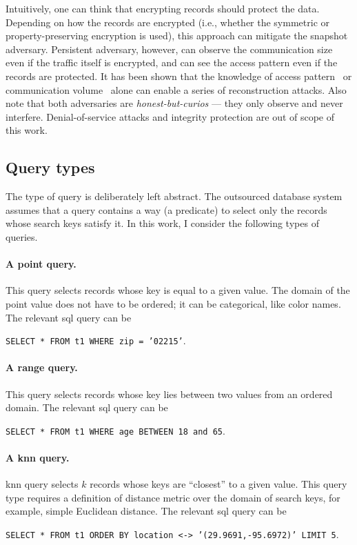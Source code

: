			Intuitively, one can think that encrypting records should protect the data.
			Depending on how the records are encrypted (i.e., whether the symmetric or property-preserving encryption is used), this approach can mitigate the snapshot adversary.
			Persistent adversary, however, can observe the communication size even if the traffic itself is encrypted, and can see the access pattern even if the records are protected.
			It has been shown that the knowledge of access pattern~\cite{multidimensional-range-queries, inference-attack-inference-attack-islam-14, leakage-abuse-attacks-cash-15, inference-attacks-naveed-15, generic-attacks-kellaris, attacks-tao-of-inference, grubbs-attacks, access-pattern-disclosure, attacks-improved-reconstruction} or communication volume~\cite{generic-attacks-kellaris, state-of-uniform, attacks-improved-reconstruction, pump-volume-attacks, volume-range-attacks} alone can enable a series of reconstruction attacks.
			Also note that both adversaries are \emph{honest-but-curios} --- they only observe and never interfere.
			Denial-of-service attacks and integrity protection are out of scope of this work.

		\subsection{Query types}

			The type of query \query{} is deliberately left abstract.
			The outsourced database system assumes that a query contains a way (a predicate) to select only the records whose search keys satisfy it.
			In this work, I consider the following types of queries.

			\paragraph*{A point query.}
				This query selects records whose key is equal to a given value.
				The domain of the point value does not have to be ordered; it can be categorical, like color names.
				The relevant \acrshort{sql} query can be

				\texttt{SELECT * FROM t1 WHERE zip = '02215'}.

			\paragraph*{A range query.}
				This query selects records whose key lies between two values from an ordered domain.
				The relevant \acrshort{sql} query can be

				\texttt{SELECT * FROM t1 WHERE age BETWEEN 18 and 65}.

			\paragraph*{A \acrshort{knn} query.}
				\acrlong{knn} query selects $k$ records whose keys are ``closest'' to a given value.
				This query type requires a definition of distance metric over the domain of search keys, for example, simple Euclidean distance.
				The relevant \acrshort{sql} query can be

				\texttt{SELECT * FROM t1 ORDER BY location <-> '(29.9691,-95.6972)' LIMIT 5}. %
